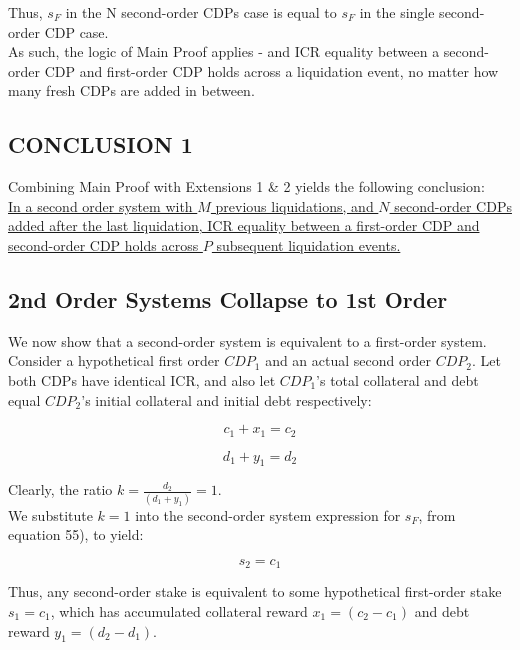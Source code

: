 \documentclass[reqno]{article}
\begin{document}
Thus, $s_F$ in the N second-order CDPs case is equal to $s_F$ in the single second-order CDP case.\\

As such, the logic of Main Proof applies - and ICR equality between a second-order CDP and first-order CDP holds across a liquidation event, no matter how many fresh CDPs are added in between.

\subsection{CONCLUSION 1}

\bigskip
Combining Main Proof with Extensions 1 \& 2 yields the following conclusion:\\

\uline{In a second order system with $M$ previous liquidations, and $N$ second-order CDPs added after the last liquidation, ICR equality between a first-order CDP and second-order CDP holds across $P$ subsequent liquidation events.}\\

\subsection{2nd Order Systems Collapse to 1st Order}
We now show that a second-order system is equivalent to a first-order system.\\

Consider a hypothetical first order $CDP_1$ and an actual second order $CDP_2$. Let both CDPs have identical ICR, and also let $CDP_1$’s total collateral and debt equal $CDP_2$’s initial collateral and initial debt respectively:

\begin{equation} 
    c_1+x_1=c_2
\end{equation}

\begin{equation} 
    d_1+y_1=d_2
\end{equation}

\bigskip
Clearly, the ratio  $k = \frac{d_2}{(d_1+y_1)} = 1$.\\

We substitute $k=1$ into the second-order system expression for $s_F$, from equation 55), to yield:

\begin{equation} 
    s_2=c_1
\end{equation}

\bigskip
Thus, any second-order stake is equivalent to some hypothetical first-order stake $s_1=c_1$, which has accumulated collateral reward $x_1=(c_2-c_1)$ and debt reward $y_1=(d_2-d_1)$.\\
\end{document}
